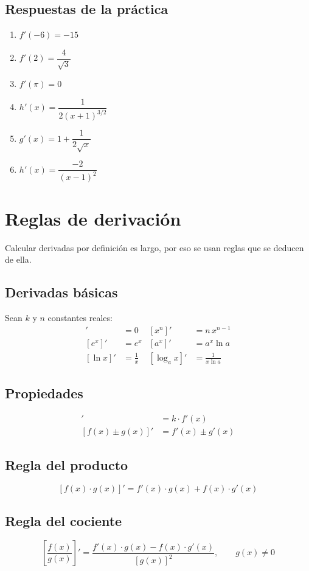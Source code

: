 \documentclass[12pt]{article}
\begin{document}
\subsection{Respuestas de la práctica}
\begin{enumerate}
    \item $f'(-6) = -15$
    \item $f'(2) = \dfrac{4}{\sqrt{3}}$
    \item $f'(\pi) = 0$
    \item $h'(x) = \dfrac{1}{2(x + 1)^{3/2}}$
    \item $g'(x) = 1 + \dfrac{1}{2\sqrt{x}}$
    \item $h'(x) = \dfrac{-2}{(x - 1)^2}$
\end{enumerate}

\section{Reglas de derivación}

Calcular derivadas por definición es largo, por eso se usan reglas que se deducen de ella.

\subsection{Derivadas básicas}

Sean $k$ y $n$ constantes reales:
\begin{align*}
[k]' &= 0 & [x^n]' &= n\,x^{n-1} \\
[e^x]' &= e^x & [a^x]' &= a^x \ln a \\
[\ln x]' &= \frac{1}{x} & [\log_a x]' &= \frac{1}{x \ln a}
\end{align*}

\subsection{Propiedades}

\begin{align*}
[k \cdot f(x)]' &= k \cdot f'(x) \\
[f(x) \pm g(x)]' &= f'(x) \pm g'(x)
\end{align*}

\subsection{Regla del producto}
\[
[f(x) \cdot g(x)]' = f'(x) \cdot g(x) + f(x) \cdot g'(x)
\]

\subsection{Regla del cociente}
\[
\left[\frac{f(x)}{g(x)}\right]' = \frac{f'(x) \cdot g(x) - f(x) \cdot g'(x)}{[g(x)]^2}, \qquad g(x) \neq 0
\]
\end{document}
